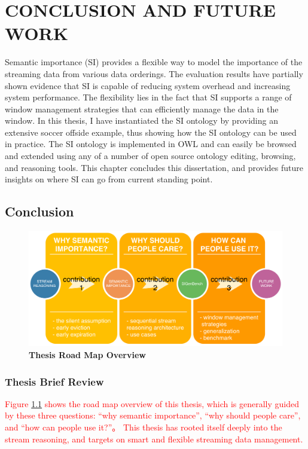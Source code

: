  
\chapter{CONCLUSION AND FUTURE WORK}
Semantic importance (SI) provides a flexible way to model the importance of the streaming data from various data orderings.
The evaluation results have partially shown evidence that SI is capable of reducing system overhead and increasing system performance. 
The flexibility lies in the fact that SI supports a range of window management strategies that can efficiently manage the data in the window. 
In this thesis, I have instantiated the SI ontology by providing an extensive soccer offside example, thus showing how the SI ontology can be used in practice.
The SI ontology is implemented in OWL and can easily be browsed and extended using any of a number of open source ontology editing, browsing, and reasoning tools.
This chapter concludes this dissertation, and provides future insights on where SI can go from current standing point. 
%
\section{Conclusion}

\begin{figure}[!htbp]
	\centering
    \includegraphics[width=5in]{img/7-trm.pdf}
    \caption{\textbf{Thesis Road Map Overview}}
    \label{fig:7-trm}
\end{figure}
%
\subsection{Thesis Brief Review}
\textcolor{red}{
Figure \ref{fig:7-trm} shows the road map overview of this thesis, which is generally guided by these three questions: 
``why semantic importance'', ``why should people care'', and ``how can people use it?''。
This thesis has rooted itself deeply into the stream reasoning, and targets on smart and flexible streaming data management. 
}

